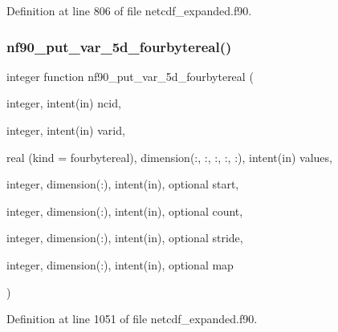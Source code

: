 Definition at line 806 of file netcdf\+\_\+expanded.\+f90.

\mbox{\label{netcdf__expanded_8f90_ad4188948f44fd394cbe276c9290c6678}} 
\subsubsection{\texorpdfstring{nf90\+\_\+put\+\_\+var\+\_\+5d\+\_\+fourbytereal()}{nf90\_put\_var\_5d\_fourbytereal()}}
{\footnotesize\ttfamily integer function nf90\+\_\+put\+\_\+var\+\_\+5d\+\_\+fourbytereal (\begin{DoxyParamCaption}\item[{integer, intent(in)}]{ncid,  }\item[{integer, intent(in)}]{varid,  }\item[{real (kind = fourbytereal), dimension(\+:, \+:, \+:, \+:, \+:), intent(in)}]{values,  }\item[{integer, dimension(\+:), intent(in), optional}]{start,  }\item[{integer, dimension(\+:), intent(in), optional}]{count,  }\item[{integer, dimension(\+:), intent(in), optional}]{stride,  }\item[{integer, dimension(\+:), intent(in), optional}]{map }\end{DoxyParamCaption})}



Definition at line 1051 of file netcdf\+\_\+expanded.\+f90.

\mbox{\label{netcdf__expanded_8f90_a8cde26b342930af72adbdbf4882f5a1b}} 
